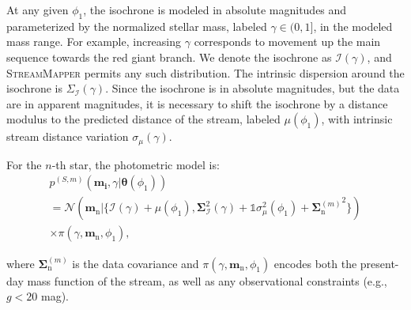 \documentclass[twocolumn, linenumbers]{aastex631}
\newcommand{\code}[1]{\textsc{#1}}
\newcommand{\package}[1]{\code{#1}}
\newcommand{\mrm}[1]{\mathrm{#1}}
\newcommand{\mbs}[1]{\boldsymbol{#1}}
\newcommand{\mcal}[1]{\mathcal{#1}}
\newcommand{\pdf}{p}
\newcommand{\prior}{\mcal{\pi}}
\newcommand{\nth}[1]{{#1}_{\mrm{n}}}  %
\newcommand{\smallcomponent}[2]{#2^{\scriptscriptstyle (#1)}}
\newcommand{\cmp}[2]{\smallcomponent{#1}{#2}}
\begin{document}
            At any given $\phi_1$, the isochrone is modeled in absolute
            magnitudes and parameterized by the normalized stellar mass, labeled
            $\gamma \in (0, 1]$, in the modeled mass range. For example,
            increasing $\gamma$ corresponds to movement up the main sequence
            towards the red giant branch. We denote the isochrone as
            $\mcal{I(\gamma)}$, and \package{StreamMapper} permits any such
            distribution. The intrinsic dispersion around the isochrone is
            $\Sigma_\mcal{I}(\gamma)$. Since the isochrone is in absolute
            magnitudes, but the data are in apparent magnitudes, it is necessary
            to shift the isochrone by a distance modulus to the predicted
            distance of the stream, labeled  $\mu(\phi_1)$, with intrinsic
            stream distance variation $\sigma_\mu(\gamma)$.
            
            For the $n$-th star, the photometric model is:
            \begin{multline} \label{eq:photometric_probability_point}
                \cmp{S,m}{\pdf}(\mbs{m_i}, \gamma | \mbs{\theta}(\phi_1)) 
                \\ = \mcal{N}(\nth{\mbs{m}} | \{\mcal{I(\gamma)} + \mu(\phi_1), \mbs{\Sigma}_{\mcal{I}}^2(\gamma) + \mathds{1} \sigma_\mu^2(\phi_1) + {\cmp{m}{\nth{\mbs{\Sigma}}}}^2 \}) \\ \times \prior(\gamma, \nth{\mbs{m}}, \phi_1),
            \end{multline}
    
            where $\cmp{m}{\nth{\mbs{\Sigma}}}$ is the data covariance and
            $\prior(\gamma, \nth{\mbs{m}}, \phi_1)$ encodes both the present-day
            mass function of the stream, as well as any observational
            constraints (e.g., $g < 20$ mag).
\end{document}
